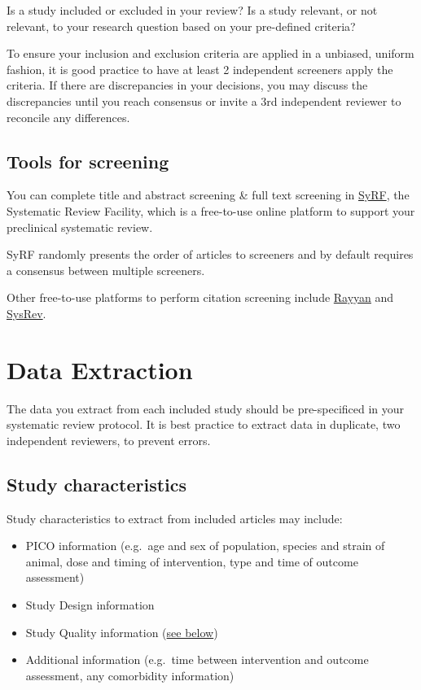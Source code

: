 \documentclass[
]{book}
\providecommand{\tightlist}{%
  \setlength{\itemsep}{0pt}\setlength{\parskip}{0pt}}
\begin{document}
Is a study included or excluded in your review? Is a study relevant, or not relevant, to your research question based on your pre-defined criteria?

To ensure your inclusion and exclusion criteria are applied in a unbiased, uniform fashion, it is good practice to have at least 2 independent screeners apply the criteria. If there are discrepancies in your decisions, you may discuss the discrepancies until you reach consensus or invite a 3rd independent reviewer to reconcile any differences.

\section{Tools for screening}\label{tools-for-screening}

You can complete title and abstract screening \& full text screening in \href{https://syrf.org.uk/}{SyRF}, the Systematic Review Facility, which is a free-to-use online platform to support your preclinical systematic review.

SyRF randomly presents the order of articles to screeners and by default requires a consensus between multiple screeners.

Other free-to-use platforms to perform citation screening include \href{https://rayyan.qcri.org/welcome}{Rayyan} and \href{https://sysrev.com/}{SysRev}.

\chapter{Data Extraction}\label{data-extraction}

The data you extract from each included study should be pre-specificed in your systematic review protocol. It is best practice to extract data in duplicate, two independent reviewers, to prevent errors.

\section{Study characteristics}\label{study-characteristics}

Study characteristics to extract from included articles may include:

\begin{itemize}
\tightlist
\item
  PICO information (e.g.~age and sex of population, species and strain of animal, dose and timing of intervention, type and time of outcome assessment)
\item
  Study Design information
\item
  Study Quality information (\hyperref[Quality-Assessment]{see below})
\item
  Additional information (e.g.~time between intervention and outcome assessment, any comorbidity information)
\end{itemize}
\end{document}
